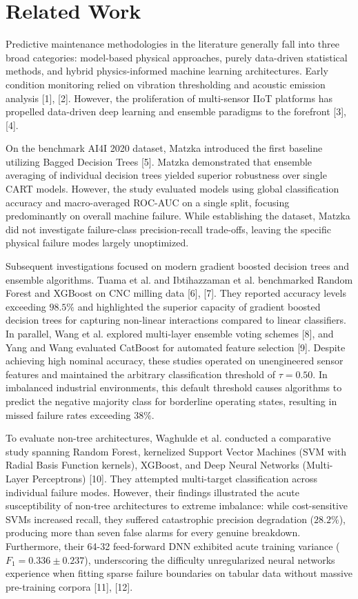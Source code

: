 \documentclass[conference]{IEEEtran}
\begin{document}
\section{Related Work}

Predictive maintenance methodologies in the literature generally fall into three broad categories: model-based physical approaches, purely data-driven statistical methods, and hybrid physics-informed machine learning architectures. Early condition monitoring relied on vibration thresholding and acoustic emission analysis [1], [2]. However, the proliferation of multi-sensor IIoT platforms has propelled data-driven deep learning and ensemble paradigms to the forefront [3], [4].

On the benchmark AI4I 2020 dataset, Matzka introduced the first baseline utilizing Bagged Decision Trees [5]. Matzka demonstrated that ensemble averaging of individual decision trees yielded superior robustness over single CART models. However, the study evaluated models using global classification accuracy and macro-averaged ROC-AUC on a single split, focusing predominantly on overall machine failure. While establishing the dataset, Matzka did not investigate failure-class precision-recall trade-offs, leaving the specific physical failure modes largely unoptimized.

Subsequent investigations focused on modern gradient boosted decision trees and ensemble algorithms. Tuama et al. and Ibtihazzaman et al. benchmarked Random Forest and XGBoost on CNC milling data [6], [7]. They reported accuracy levels exceeding $98.5\%$ and highlighted the superior capacity of gradient boosted decision trees for capturing non-linear interactions compared to linear classifiers. In parallel, Wang et al. explored multi-layer ensemble voting schemes [8], and Yang and Wang evaluated CatBoost for automated feature selection [9]. Despite achieving high nominal accuracy, these studies operated on unengineered sensor features and maintained the arbitrary classification threshold of $\tau = 0.50$. In imbalanced industrial environments, this default threshold causes algorithms to predict the negative majority class for borderline operating states, resulting in missed failure rates exceeding $38\%$.

To evaluate non-tree architectures, Waghulde et al. conducted a comparative study spanning Random Forest, kernelized Support Vector Machines (SVM with Radial Basis Function kernels), XGBoost, and Deep Neural Networks (Multi-Layer Perceptrons) [10]. They attempted multi-target classification across individual failure modes. However, their findings illustrated the acute susceptibility of non-tree architectures to extreme imbalance: while cost-sensitive SVMs increased recall, they suffered catastrophic precision degradation ($28.2\%$), producing more than seven false alarms for every genuine breakdown. Furthermore, their 64-32 feed-forward DNN exhibited acute training variance ($F_1 = 0.336 \pm 0.237$), underscoring the difficulty unregularized neural networks experience when fitting sparse failure boundaries on tabular data without massive pre-training corpora [11], [12].
\end{document}
